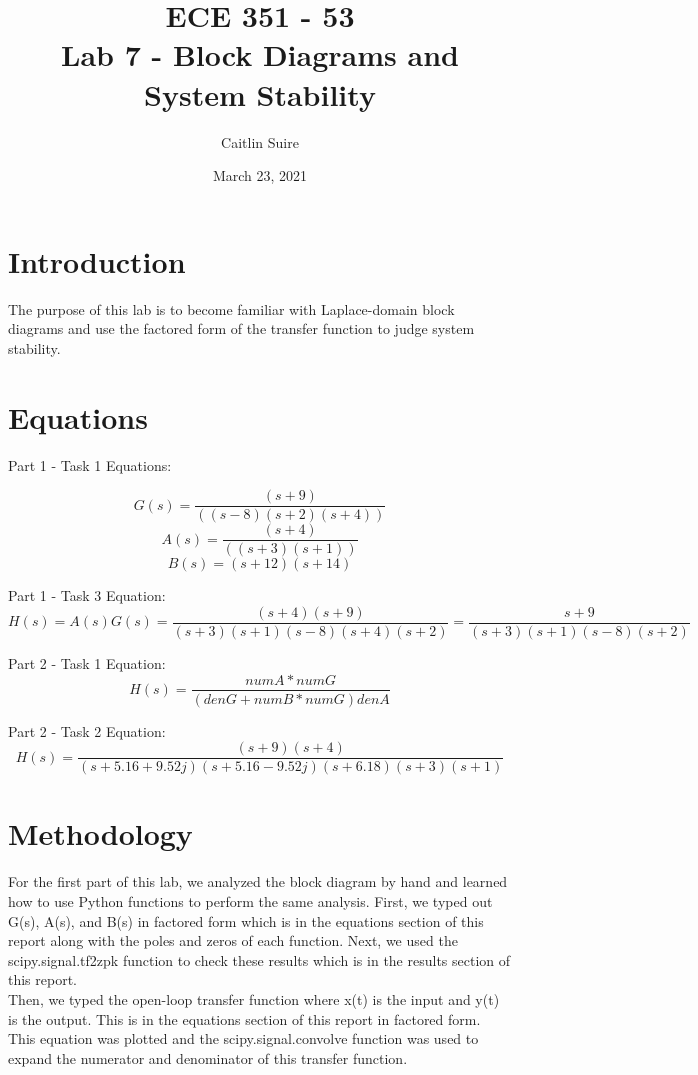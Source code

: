 \documentclass[12pt]{report}
\title{\myfont \textbf{ ECE 351 - 53 \\ \bigskip Lab 7 - Block Diagrams and System Stability}}
\author{Caitlin Suire}
\date{March 23, 2021}
\begin{document}
\maketitle

\thispagestyle{empty}

\newpage

\tableofcontents
\pagebreak


\section{Introduction}
The purpose of this lab is to become familiar with Laplace-domain block diagrams and use the factored form of the transfer function to judge system stability. 

\section{Equations}
Part 1 - Task 1 Equations:

\[G(s) = \frac{(s+9)}{((s-8)(s+2)(s+4))}\]
\[A(s) = \frac{(s+4)}{((s+3)(s+1))}\]
\[B(s) = (s+12)(s+14)\]

\noindent Part 1 - Task 3 Equation:
\[H(s) = A(s)G(s) = \frac{(s+4)(s+9)}{(s+3)(s+1)(s-8)(s+4)(s+2)} = \frac{s+9}{(s+3)(s+1)(s-8)(s+2)}\]

\noindent Part 2 - Task 1 Equation:
\[H(s) = \frac{numA * numG}{(denG+numB*numG)denA}\]

\noindent Part 2 - Task 2 Equation:
\[H(s) = \frac{(s+9)(s+4)}{(s+5.16+9.52j)(s+5.16-9.52j)(s+6.18)(s+3)(s+1)}\]


\section{Methodology}
For the first part of this lab, we analyzed the block diagram by hand and learned how to use Python functions to perform the same analysis. First, we typed out G(s), A(s), and B(s) in factored form which is in the equations section of this report along with the poles and zeros of each function. Next, we used the scipy.signal.tf2zpk function to check these results which is in the results section of this report. \\

\noindent Then, we typed the open-loop transfer function where x(t) is the input and y(t) is the output. This is in the equations section of this report in factored form. This equation was plotted and the scipy.signal.convolve function was used to expand the numerator and denominator of this transfer function. \\
\end{document}

